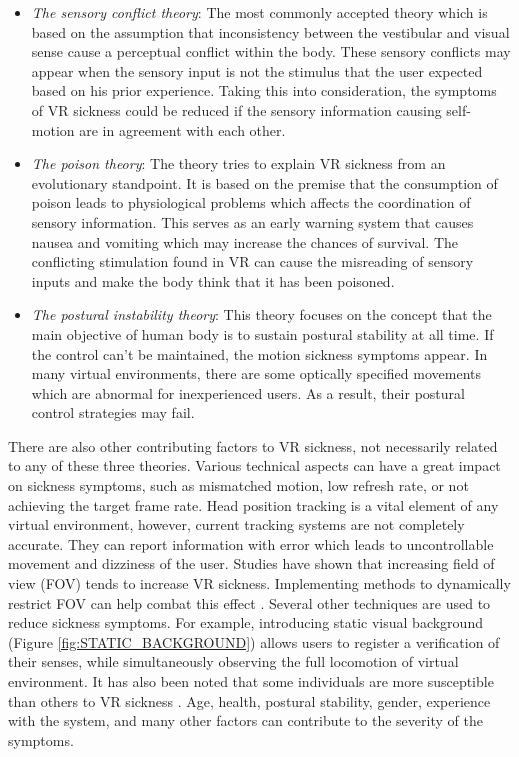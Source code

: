 \begin{itemize}
\item \textit{The sensory conflict theory}: The most commonly accepted theory which is based on the assumption that inconsistency between the vestibular and visual sense cause a perceptual conflict within the body. These sensory conflicts may appear when the sensory input is not the stimulus that the user expected based on his prior experience. Taking this into consideration, the symptoms of VR sickness could be reduced if the sensory information causing self-motion are in agreement with each other.
\item \textit{The poison theory}: The theory tries to explain VR sickness from an evolutionary standpoint. It is based on the premise that the consumption of poison leads to physiological problems which affects the coordination of sensory information. This serves as an early warning system that causes nausea and vomiting which may increase the chances of survival. The conflicting stimulation found in VR can cause the misreading of sensory inputs and make the body think that it has been poisoned.
\item \textit{The postural instability theory}: This theory focuses on the concept that the main objective of human body is to sustain postural stability at all time. If the control can't be maintained, the motion sickness symptoms appear. In many virtual environments, there are some optically specified movements which are abnormal for inexperienced users. As a result, their postural control strategies may fail.
\end{itemize}

There are also other contributing factors to VR sickness, not necessarily related to any of these three theories. Various technical aspects can have a great impact on sickness symptoms, such as mismatched motion, low refresh rate, or not achieving the target frame rate. Head position tracking is a vital element of any virtual environment, however, current tracking systems are not completely accurate. They can report information with error which leads to uncontrollable movement and dizziness of the user. Studies have shown that increasing field of view (FOV) tends to increase VR sickness. Implementing methods to dynamically restrict FOV can help combat this effect \cite{DYNAMICFOD}. Several other techniques are used to reduce sickness symptoms. For example, introducing static visual background (Figure \ref{fig:STATIC_BACKGROUND}) allows users to register a verification of their senses, while simultaneously observing the full locomotion of virtual environment. It has also been noted that some individuals are more susceptible than others to VR sickness \cite{VRINDIVIDUALS}. Age, health, postural stability, gender, experience with the system, and many other factors can contribute to the severity of the symptoms.

